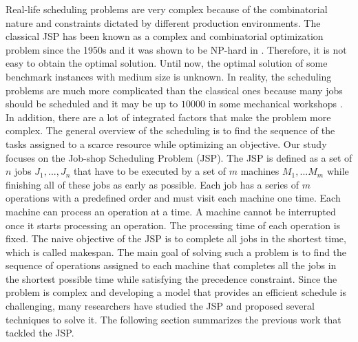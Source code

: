 \documentclass[submission,copyright,creativecommons]{eptcs}
\begin{document}
Real-life scheduling problems are very complex because of the combinatorial nature and constraints dictated by different production environments. The classical JSP has been known as a complex and combinatorial optimization problem since the 1950s and it was shown to be NP-hard in \cite{lenstra1977complexity}. Therefore, it is not easy to obtain the optimal solution. Until now, the optimal solution of some benchmark instances with medium size is unknown. In reality, the scheduling problems are much more complicated than the classical ones because many jobs should be scheduled and it may be up to $10000$ in some mechanical workshops \cite{zhang2010hybrid}. In addition, there are a lot of integrated factors that make the problem more complex. The general overview of the scheduling is to find the sequence of the tasks assigned to a scarce resource while optimizing an objective. Our study focuses on the Job-shop Scheduling Problem (JSP). The JSP is defined as a set of $n$ jobs $J_{1}, ..., J_{n}$ that have to be executed by a set of $m$ machines $M_{1}, ... M_{m}$ while finishing all of these jobs as early as possible. Each job has a series of $m$ operations with a predefined order and must visit each machine one time. Each machine can process an operation at a time. A machine cannot be interrupted once it starts processing an operation. The processing time of each operation is fixed. The naive objective of the JSP is to complete all jobs in the shortest time, which is called makespan. The main goal of solving such a problem is to find the sequence of operations assigned to each machine that completes all the jobs in the shortest possible time while satisfying the precedence constraint. Since the problem is complex and developing a model that provides an efficient schedule is challenging, many researchers have studied the JSP and proposed several techniques to solve it. The following section summarizes the previous work that tackled the JSP.
\end{document}
